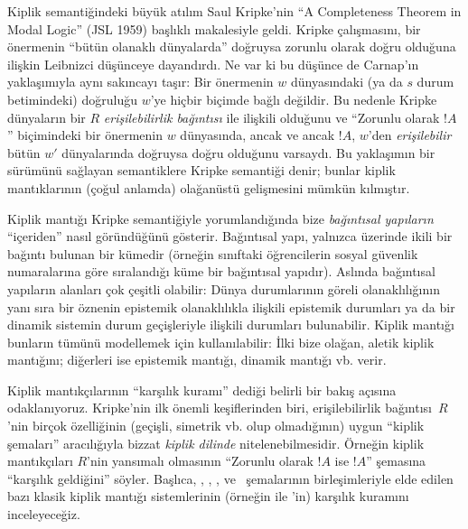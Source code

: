 Kiplik semantiğindeki büyük atılım Saul Kripke'nin ``A Completeness Theorem
in Modal Logic'' (JSL 1959) başlıklı makalesiyle geldi. Kripke çalışmasını,
bir önermenin ``bütün olanaklı dünyalarda'' doğruysa zorunlu olarak doğru
olduğuna ilişkin Leibnizci düşünceye dayandırdı. Ne var ki bu düşünce de
Carnap'ın yaklaşımıyla aynı sakıncayı taşır: Bir önermenin $w$ dünyasındaki
(ya da $s$ durum betimindeki) doğruluğu $w$'ye hiçbir biçimde bağlı değildir.
Bu nedenle Kripke dünyaların bir $R$ \emph{erişilebilirlik bağıntısı} ile
ilişkili olduğunu ve ``Zorunlu olarak $!A$'' biçimindeki bir önermenin
$w$ dünyasında, ancak ve ancak $!A$, $w$'den \emph{erişilebilir} bütün
$w'$ dünyalarında doğruysa doğru olduğunu varsaydı. Bu yaklaşımın bir
sürümünü sağlayan semantiklere Kripke semantiği denir; bunlar kiplik
mantıklarının (çoğul anlamda) olağanüstü gelişmesini mümkün kılmıştır.

Kiplik mantığı Kripke semantiğiyle yorumlandığında bize \emph{bağıntısal
yapıların} ``içeriden'' nasıl göründüğünü gösterir. Bağıntısal yapı, yalnızca
üzerinde ikili bir bağıntı bulunan bir kümedir (örneğin sınıftaki öğrencilerin
sosyal güvenlik numaralarına göre sıralandığı küme bir bağıntısal yapıdır).
Aslında bağıntısal yapıların alanları çok çeşitli olabilir: Dünya
durumlarının göreli olanaklılığının yanı sıra bir öznenin epistemik
olanaklılıkla ilişkili epistemik durumları ya da bir dinamik sistemin durum
geçişleriyle ilişkili durumları bulunabilir. Kiplik mantığı bunların tümünü
modellemek için kullanılabilir: İlki bize olağan, aletik kiplik mantığını;
diğerleri ise epistemik mantığı, dinamik mantığı vb. verir.

Kiplik mantıkçılarının ``karşılık kuramı'' dediği belirli bir bakış açısına
odaklanıyoruz. Kripke'nin ilk önemli keşiflerinden biri, erişilebilirlik
bağıntısı~$R$'nin birçok özelliğinin (geçişli, simetrik vb. olup olmadığının)
uygun ``kiplik şemaları'' aracılığıyla bizzat \emph{kiplik dilinde}
nitelenebilmesidir. Örneğin kiplik mantıkçıları $R$'nin yansımalı olmasının
``Zorunlu olarak $!A$ ise $!A$'' şemasına ``karşılık geldiğini'' söyler.
Başlıca, , , ,  ve~ şemalarının
birleşimleriyle elde edilen bazı klasik kiplik mantığı sistemlerinin
(örneğin  ile 'in) karşılık kuramını inceleyeceğiz.


